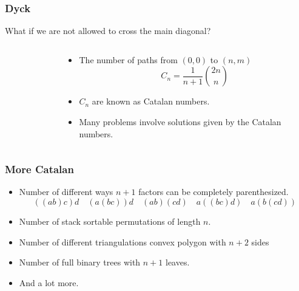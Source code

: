 \documentclass{beamer}
\begin{document}
\begin{frame}[plain]
  \frametitle{Dyck}
  What if we are not allowed to cross the main diagonal?
  \begin{columns}
    \begin{column}{.4\textwidth}
      \begin{figure}
      \end{figure}
    \end{column}
    \begin{column}{.6\textwidth}
      \begin{itemize}
        \item The number of paths from $(0,0)$ to $(n,m)$
          \[
            C_n = \frac{1}{n+1}\binom{2n}{n}
          \]
        \item $C_n$ are known as Catalan numbers.
        \item Many problems involve solutions given by the Catalan numbers.
      \end{itemize}
    \end{column}
  \end{columns}
\end{frame}

\begin{frame}[plain]
  \frametitle{More Catalan}
  \begin{itemize}
    \item Number of different ways $n+1$ factors can be completely parenthesized.
      \[
        ((ab)c)d\quad(a(bc))d\quad(ab)(cd)\quad a((bc)d)\quad a(b(cd))
      \]
    \item Number of stack sortable permutations of length $n$.
    \item Number of different triangulations convex polygon with $n+2$ sides
    \item Number of full binary trees with $n+1$ leaves.
    \item And a lot more.
  \end{itemize}
\end{frame}
\end{document}
